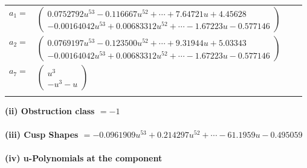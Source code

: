 \documentclass[1p]{elsarticle_modified}
\theoremstyle{definition}
\begin{document}
\begin{tabular}{m{7pt} m{180pt} m{7pt} m{180pt} }
\flushright $a_{1}=$&$\begin{pmatrix}0.0752792 u^{53}-0.116667 u^{52}+\cdots+7.64721 u+4.45628\\-0.00164042 u^{53}+0.00683312 u^{52}+\cdots-1.67223 u-0.577146\end{pmatrix}$ \\
\flushright $a_{2}=$&$\begin{pmatrix}0.0769197 u^{53}-0.123500 u^{52}+\cdots+9.31944 u+5.03343\\-0.00164042 u^{53}+0.00683312 u^{52}+\cdots-1.67223 u-0.577146\end{pmatrix}$ \\
\flushright $a_{7}=$&$\begin{pmatrix}u^3\\- u^3- u\end{pmatrix}$\\&\end{tabular}
\flushleft \textbf{(ii) Obstruction class $= -1$}\\~\\
\flushleft \textbf{(iii) Cusp Shapes $= -0.0961909 u^{53}+0.214297 u^{52}+\cdots-61.1959 u-0.495059$}\\~\\
\newpage\renewcommand{\arraystretch}{1}
\flushleft \textbf{(iv) u-Polynomials at the component}\newline \\
\end{document}
